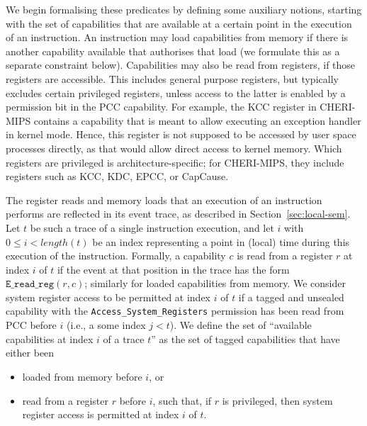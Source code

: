 \documentclass[11pt]{article}
\theoremstyle{definition}
\begin{document}
We begin formalising these predicates by defining some auxiliary notions,
starting with the set of capabilities that are available at a certain point
in the execution of an instruction.
An instruction may load capabilities from memory if there is another
capability available that authorises that load (we formulate this as a separate
constraint below).  Capabilities may also be read from registers, if those
registers are accessible.  This includes general purpose registers, but
typically excludes certain privileged registers, unless access to the latter is
enabled by a permission bit in the PCC capability.  For example, the
KCC register in CHERI-MIPS contains a capability that is meant to allow
executing an exception handler in kernel mode.  Hence, this register is not
supposed to be accessed by user space processes directly, as that would allow
direct access to kernel memory.  Which registers are privileged is
architecture-specific;
for CHERI-MIPS, they include registers such as KCC, KDC, EPCC, or \mbox{CapCause}.
\newcommand{\take}{\mathit{take}}

The register reads and memory loads that an execution of an instruction performs
are reflected in its event trace, as described in Section~\ref{sec:local-sem}.
Let $t$ be such a trace of a single instruction execution, and let $i$ with
$0 \leq i < \mathit{length}(t)$ be an index representing a point in (local)
time during this execution of the instruction.
Formally, a capability $c$ is read from a register $r$ at index $i$ of $t$ if
the event at that position in the trace has the form $\texttt{E\_read\_reg}(r, c)$;
similarly for loaded capabilities from memory.
We consider system register access to be permitted at index $i$ of $t$
if a tagged and unsealed capability with the \verb|Access_System_Registers| permission
has been read from PCC before $i$ (i.e., a some index $j < t$).
We define the set of ``available capabilities at
index $i$ of a trace $t$'' as the set of tagged capabilities that
have either been
\begin{itemize}
\item loaded from memory before $i$, or
\item read from a register $r$ before $i$, such that, if %
  $r$ is privileged, then %
  system register access is permitted at index $i$ of $t$.
\end{itemize}
\end{document}
